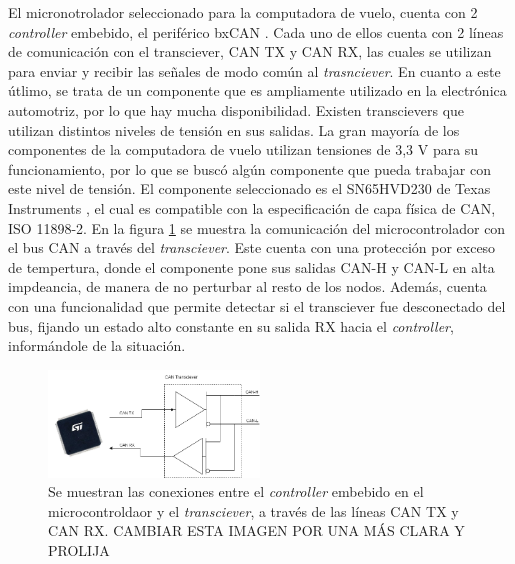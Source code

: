 



El micronotrolador seleccionado para la computadora de vuelo, cuenta con 2 \textit{controller} embebido, el periférico bxCAN \cite{STM32F746ZG}. Cada uno de ellos cuenta con 2 líneas de comunicación con el transciever, CAN TX y CAN RX, las cuales se utilizan para enviar y recibir las señales de modo común al \textit{trasnciever}. En cuanto a este útlimo, se trata de un componente que es ampliamente utilizado en la electrónica automotriz, por lo que hay mucha disponibilidad. Existen transcievers que utilizan distintos niveles de tensión en sus salidas. La gran mayoría de los componentes de la computadora de vuelo utilizan tensiones de 3,3 V para su funcionamiento, por lo que se buscó algún componente que pueda trabajar con este nivel de tensión. El componente seleccionado es el SN65HVD230 de Texas Instruments \cite{SN65VHD230}, el cual es compatible con la especificación de capa física de CAN, ISO 11898-2. En la figura \ref{fig:microcontrolador_transciever} se muestra la comunicación del microcontrolador con el bus CAN a través del \textit{transciever}. Este cuenta con una protección por exceso de tempertura, donde el componente pone sus salidas CAN-H y CAN-L en alta impdeancia, de manera de no perturbar al resto de los nodos. Además, cuenta con una funcionalidad que permite detectar si el transciever fue desconectado del bus, fijando un estado alto constante en su salida RX hacia el \textit{controller}, informándole de la situación.

\begin{figure}[H]
    \centering
    \includegraphics[width=0.5\textwidth]{img/microcontrolador_transciever.png}    
    \caption{Se muestran las conexiones entre el \textit{controller} embebido en el microcontroldaor y el \textit{transciever}, a través de las líneas CAN TX y CAN RX. {\color{red} CAMBIAR ESTA IMAGEN POR UNA MÁS CLARA Y PROLIJA}}
    \label{fig:microcontrolador_transciever}
\end{figure}

